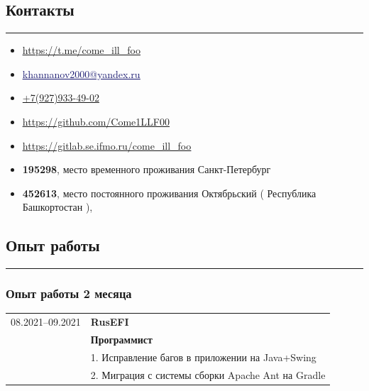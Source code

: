 \documentclass[10pt, final, twoside]{article}
\begin{document}
  \subsection*{\textcolor{darkgray2}{Контакты}}
  \vspace*{-5.5mm}
  \par\noindent\rule{\textwidth}{0.1pt}
  \begin{itemize}
    \item[\textcolor{MidnightBlue}{\textbullet}] \textcolor{MidnightBlue}{\underline{\url{https://t.me/come_ill_foo}}}
    \item[\textcolor{MidnightBlue}{\textbullet}] \href{mailto:khannanov2000@yandex.ru}{\textcolor{MidnightBlue}{\underline{khannanov2000@yandex.ru}}}
    \item[\textcolor{MidnightBlue}{\textbullet}] \href{tel:79279334902}{+7(927)933-49-02}
    \item[\textcolor{MidnightBlue}{\textbullet}] \textcolor{MidnightBlue}{\underline{\url{https://github.com/Come1LLF00}}}
    \item[\textcolor{MidnightBlue}{\textbullet}] \textcolor{MidnightBlue}{\underline{\url{https://gitlab.se.ifmo.ru/come_ill_foo}}}
  \end{itemize}

  \begin{itemize}
    \item \textbf{195298}, место временного проживания Санкт-Петербург
    \item \textbf{452613}, место постоянного проживания Октябрьский ( Республика Башкортостан ),
  \end{itemize}

  
  \subsection*{\textcolor{darkgray2}{Опыт работы}}
  \vspace*{-5.5mm}
  \par\noindent\rule{\textwidth}{0.1pt}
  \subsubsection*{Опыт работы 2 месяца}
  \begin{table}[H]
    \begin{tabular}{ll}
      08.2021--09.2021 & \textbf{RusEFI}\\
                       & \textbf{Программист}\\
                       & 1. Исправление багов в приложении на Java+Swing\\
                       & 2. Миграция с системы сборки Apache Ant на Gradle 
    \end{tabular}
  \end{table}
\end{document}
